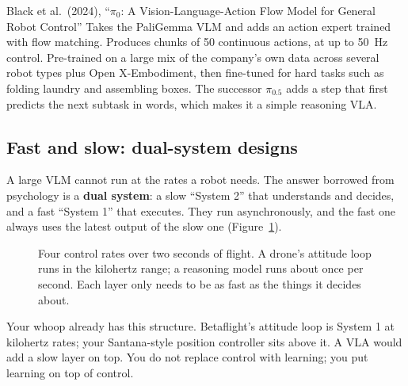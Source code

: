 \begin{paperbox}{Black et al.\ (2024), ``$\pi_0$: A Vision-Language-Action Flow Model for General Robot Control''}
Takes the PaliGemma VLM and adds an action expert trained with flow matching. Produces chunks of 50 continuous actions, at up to 50~Hz control. Pre-trained on a large mix of the company's own data across several robot types plus Open X-Embodiment, then fine-tuned for hard tasks such as folding laundry and assembling boxes. The successor $\pi_{0.5}$ adds a step that first predicts the next subtask in words, which makes it a simple reasoning VLA.
\end{paperbox}

\subsection{Fast and slow: dual-system designs}
\label{sec:dual}
A large VLM cannot run at the rates a robot needs. The answer borrowed from psychology is a \textbf{dual system}: a slow ``System 2'' that understands and decides, and a fast ``System 1'' that executes. They run asynchronously, and the fast one always uses the latest output of the slow one (Figure~\ref{fig:rates}).

\begin{figure}[h]
\centering
{}
\caption{Four control rates over two seconds of flight. A drone's attitude loop runs in the kilohertz range; a reasoning model runs about once per second. Each layer only needs to be as fast as the things it decides about.}
\label{fig:rates}
\end{figure}

\begin{bridgebox}
Your whoop already has this structure. Betaflight's attitude loop is System 1 at kilohertz rates; your Santana-style position controller sits above it. A VLA would add a slow layer on top. You do not replace control with learning; you put learning on top of control.
\end{bridgebox}

